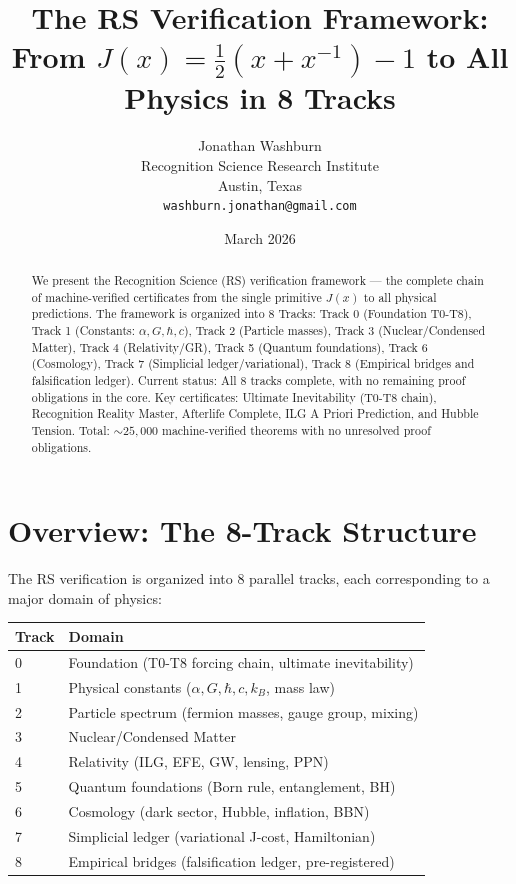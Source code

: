 \documentclass[12pt,a4paper]{article}
\title{The RS Verification Framework:\\
From $J(x) = \frac{1}{2}(x+x^{-1})-1$ to All Physics in 8 Tracks}
\author{Jonathan Washburn\\
Recognition Science Research Institute\\
Austin, Texas\\
\texttt{washburn.jonathan@gmail.com}}
\date{March 2026}
\theoremstyle{definition}
\theoremstyle{remark}
\begin{document}
\maketitle

\begin{abstract}
We present the Recognition Science (RS) verification framework — the complete 
chain of machine-verified certificates from the single primitive $J(x)$ to 
all physical predictions. The framework is organized into 8 Tracks:
Track 0 (Foundation T0-T8), Track 1 (Constants: $\alpha, G, \hbar, c$), 
Track 2 (Particle masses), Track 3 (Nuclear/Condensed Matter), 
Track 4 (Relativity/GR), Track 5 (Quantum foundations), 
Track 6 (Cosmology), Track 7 (Simplicial ledger/variational), 
Track 8 (Empirical bridges and falsification ledger).
Current status: All 8 tracks complete, with no remaining proof obligations in the core. 
Key certificates: Ultimate Inevitability (T0-T8 chain), 
Recognition Reality Master, Afterlife Complete, 
ILG A Priori Prediction, and Hubble Tension.
Total: $\sim 25{,}000$ machine-verified theorems with no unresolved proof obligations.
\end{abstract}

\section{Overview: The 8-Track Structure}

The RS verification is organized into 8 parallel tracks, each corresponding 
to a major domain of physics:

\begin{center}
\begin{tabular}{ll}
\hline
Track & Domain \\
\hline
0 & Foundation (T0-T8 forcing chain, ultimate inevitability) \\
1 & Physical constants ($\alpha, G, \hbar, c, k_B$, mass law) \\
2 & Particle spectrum (fermion masses, gauge group, mixing) \\
3 & Nuclear/Condensed Matter \\
4 & Relativity (ILG, EFE, GW, lensing, PPN) \\
5 & Quantum foundations (Born rule, entanglement, BH) \\
6 & Cosmology (dark sector, Hubble, inflation, BBN) \\
7 & Simplicial ledger (variational J-cost, Hamiltonian) \\
8 & Empirical bridges (falsification ledger, pre-registered) \\
\hline
\end{tabular}
\end{center}
\end{document}
